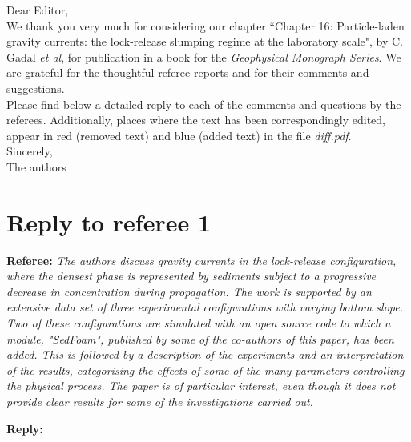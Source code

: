 \documentclass[12pt]{article}
\newcommand{\MajorReply}[2]{\noindent
\textbf{Referee:}
\emph{#1}

\medskip
\noindent\textbf{Reply:} {\color{blue}#2}
\vspace*{0.4 cm}}
\begin{document}
\noindent Dear Editor,\\

\noindent We thank you very much for considering our chapter ``Chapter 16: Particle-laden gravity currents: the lock-release slumping regime at the laboratory scale", by C. Gadal \emph{et al}, for publication in a book for the \emph{Geophysical Monograph Series}. We are grateful for the thoughtful referee reports and for their comments and suggestions. \\

\noindent
Please find below a detailed reply to each of the comments and questions by the referees. Additionally, places where the text has been correspondingly edited, appear in red (removed text) and blue (added text) in the file \emph{diff.pdf}. \\

\noindent Sincerely, \\

\noindent The authors


\newpage
\section{Reply to referee 1}

\MajorReply{The authors discuss gravity currents in the lock-release configuration, where the densest phase is represented by sediments subject to a progressive decrease in concentration during propagation. The work is supported by an extensive data set of three experimental configurations with varying bottom slope. Two of these configurations are simulated with an open source code to which a module, "SedFoam", published by some of the co-authors of this paper, has been added. This is followed by a description of the experiments and an interpretation of the results, categorising the effects of some of the many parameters controlling the physical process. The paper is of particular interest, even though it does not provide clear results for some of the investigations carried out.
}{}
\end{document}
